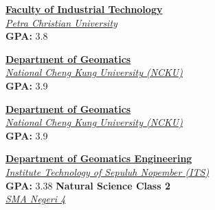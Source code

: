 \documentclass[
  a4paper, 
   maincolor=cvblue,
   sectioncolor=cvblue,
]{fortysecondscv}
\begin{document}
\begin{cvtable}
	{
		\href{https://dlinogarda.com}{\textbf{Faculty of Industrial Technology}}\\
		\href{https://dlinogarda.com}{\textit{Petra Christian University}}\\
		\textbf{GPA: } 3.8
	}
	
		{
		\href{https://www.geomatics.ncku.edu.tw/english/}{\textbf{Department of Geomatics}}\\
		\href{https://www.ncku.edu.tw/}{\textit{National Cheng Kung University (NCKU)}}\\
		\textbf{GPA: } 3.9
		}
		
		{
		\href{https://www.geomatics.ncku.edu.tw/english/}{\textbf{Department of Geomatics}}\\
		\href{https://www.ncku.edu.tw/}{\textit{National Cheng Kung University (NCKU)}}\\
		\textbf{GPA: } 3.9
		}
\end{cvtable}

\begin{cvtable}
		{
		\href{https://www.its.ac.id/tgeomatika/}{\textbf{Department of Geomatics Engineering}}\\
		\href{https://www.its.ac.id/}{\textit{Institute Technology of Sepuluh Nopember (ITS)}}\\
		\textbf{GPA: } 3.38
		}
		{
		\textbf{Natural Science Class 2}\\
		\href{http://sman4kediri.siap-sekolah.com/kurikulum-akademik/\#.Y2CWXnZByHs}{\textit{SMA Negeri 4}}%
		}
\end{cvtable}
\end{document}

